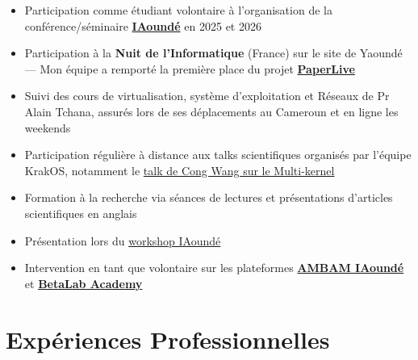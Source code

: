 \documentclass[12pt, a4paper]{article}
\begin{document}
\vspace{4pt}
\begin{itemize}[leftmargin=1.4em, itemsep=2pt, topsep=2pt, parsep=0pt]
  \item Participation comme \'etudiant volontaire \`a l'organisation de la conf\'erence/s\'eminaire \href{https://grenoble.iaounde.com/}{\textbf{IAound\'e}} en 2025 et 2026
  \item Participation \`a la \textbf{Nuit de l'Informatique} (France) sur le site de Yaound\'e --- Mon \'equipe a remport\'e la premi\`ere place du projet \href{https://www.nuitdelinfo.com/inscription/defis/511}{\textbf{PaperLive}}
  \item Suivi des cours de virtualisation, syst\`eme d'exploitation et R\'eseaux de Pr Alain Tchana, assur\'es lors de ses d\'eplacements au Cameroun et en ligne les weekends
  \item Participation r\'eguli\`ere \`a distance aux talks scientifiques organis\'es par l'\'equipe KrakOS, notamment le \href{https://www.liglab.fr/fr/presentation/animation-scientifique/organisation-devenements/talk-cong-wang}{talk de Cong Wang sur le Multi-kernel}
  \item Formation \`a la recherche via s\'eances de lectures et pr\'esentations d'articles scientifiques en anglais
  \item Pr\'esentation lors du \href{https://helios.academy/ws1.html}{workshop IAound\'e}
  \item Intervention en tant que volontaire sur les plateformes \href{https://abam.iaounde.com/}{\textbf{AMBAM IAound\'e}} et \href{https://betalab.academy/}{\textbf{BetaLab Academy}}
\end{itemize}




\newpage

\section{Exp\'eriences Professionnelles}
\end{document}
